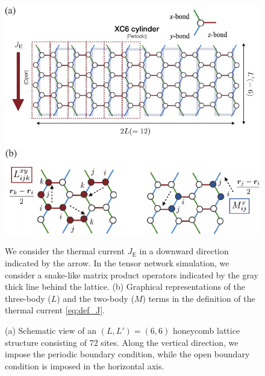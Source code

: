 \documentclass[twocolumn,superscriptaddress,showpacs, longbibliography, aps, prb]{revtex4-2}
\def\vec#1{\boldsymbol #1}
\newcommand{\red}[1]{\textcolor{red}{#1}}
\begin{document}
\begin{figure}
  \begin{center}
    \includegraphics[width=\linewidth]{Figs/lattice.pdf}
  \end{center}
  \caption{(a) Schematic view of an $(L, L') = (6, 6) $ honeycomb lattice structure consisting of 72 sites. Along the vertical direction, we impose the periodic boundary condition, 
  while %
  the open boundary condition is imposed in the horizontal axis.}
  We consider the thermal current $J_{\mathrm{E}}$ in a downward direction indicated by the arrow. In the tensor network simulation, we consider a snake-like matrix product operators indicated by the gray thick line behind the lattice. (b) Graphical representations of the three-body ($L$) and the two-body ($M$) terms in the definition of the thermal current \eqref{eq:def_J}.
  \label{fig:lattice}
\end{figure}

\end{document}
